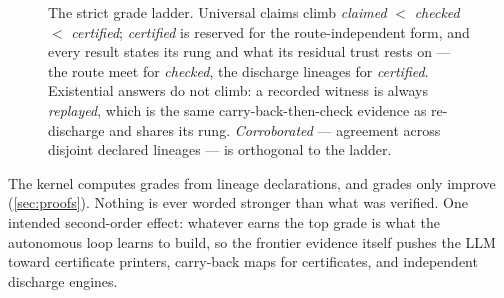 \begin{figure}
\centering
{}
\caption{The strict grade ladder. Universal claims climb
\textit{claimed} $<$ \textit{checked} $<$ \textit{certified};
\emph{certified} is reserved for the route-independent form, and
every result states its rung and what its residual trust rests on
--- the route meet for \textit{checked}, the discharge lineages for
\textit{certified}. Existential answers do not climb: a recorded
witness is always \emph{replayed}, which is the same
carry-back-then-check evidence as re-discharge and shares its rung.
\textit{Corroborated} --- agreement across disjoint declared
lineages --- is orthogonal to the ladder.}
\label{fig:ladder}
\end{figure}

The kernel computes grades from lineage declarations, and grades
only improve (\cref{sec:proofs}). Nothing is ever worded stronger
than what was verified. One intended second-order effect: whatever
earns the top grade is what the autonomous loop learns to build, so
the frontier evidence itself pushes the LLM toward certificate
printers, carry-back maps for certificates, and independent
discharge engines.

